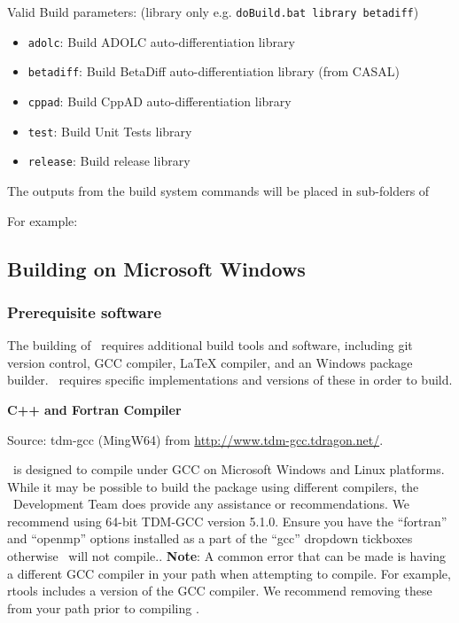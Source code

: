 Valid Build parameters: (library only e.g. \texttt{doBuild.bat library betadiff})
\begin{itemize}
  \item \texttt{adolc}: Build ADOLC auto-differentiation library
  \item \texttt{betadiff}: Build BetaDiff auto-differentiation library (from CASAL)
  \item \texttt{cppad}: Build CppAD auto-differentiation library
  \item \texttt{test}: Build Unit Tests library
  \item \texttt{release}: Build release library
\end{itemize}

The outputs from the build system commands will be placed in sub-folders of 

For example:





\subsection{Building on Microsoft Windows}

\subsubsection{Prerequisite software}

The building of \CNAME\ requires additional build tools and software, including git version control, GCC compiler, LaTeX compiler, and an Windows package builder. \CNAME\ requires specific implementations and versions of these in order to build.

\textbf{C++ and Fortran Compiler}

Source: tdm-gcc (MingW64) from \url{http://www.tdm-gcc.tdragon.net/}.

\CNAME\ is designed to compile under GCC on Microsoft Windows and Linux  platforms. While it may be possible to build the package using different compilers, the \CNAME\ Development Team does provide any assistance or recommendations. We recommend using 64-bit TDM-GCC version 5.1.0. Ensure you have the \enquote{fortran} and \enquote{openmp} options installed as a part of the \enquote{gcc} dropdown tickboxes otherwise \CNAME\ will not compile.. \textbf{Note}: A common error that can be made is having a different GCC compiler in your path when attempting to compile. For example, rtools includes a version of the GCC compiler. We recommend removing these from your path prior to compiling \CNAME.

